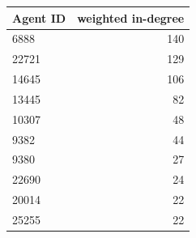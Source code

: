 \begin{tabular}{lr}\hline
Agent ID & weighted in-degree \\ \hline
6888 & 140 \\ 
22721 & 129 \\ 
14645 & 106 \\ 
13445 & 82 \\ 
10307 & 48 \\ 
9382 & 44 \\ 
9380 & 27 \\ 
22690 & 24 \\ 
20014 & 22 \\ 
25255 & 22 \\ 
\hline\end{tabular}
